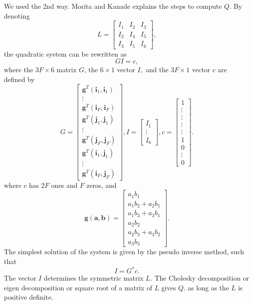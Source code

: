 We used the 2nd way. 
Morita and Kanade\cite{Morita} explains the steps to compute $ Q $. 
By denoting 
$$ L = \left[ \begin{array}{ccc}
I_1 & I_2 & I_3 \\
I_2 & I_4 & I_5 \\ 
I_3 & I_5 & I_6 \end{array} \right], $$
the quadratic system can be rewritten as
$$ GI = c, $$
where the $ 3F \times 6 $ matrix $ G $, the $ 6 \times 1 $ vector $ I, $ and the $ 3F \times 1 $ vector $ c $ are defined by
\begin{equation}
G = \left[  \begin{array}{c}
\mathbf{g}^T(\mathbf{i}_1, \mathbf{i}_1) \\
\vdots \\
\mathbf{g}^T(\mathbf{i}_F, \mathbf{i}_F) \\
\mathbf{g}^T(\mathbf{j}_1, \mathbf{j}_1) \\
\vdots \\
\mathbf{g}^T(\mathbf{j}_F, \mathbf{j}_F) \\
\mathbf{g}^T(\mathbf{i}_1, \mathbf{j}_1) \\
\vdots \\
\mathbf{g}^T(\mathbf{i}_F, \mathbf{j}_F) \end{array} \right], 
I = \left[ \begin{array}{c}
I_1    \\
\vdots \\
I_6 \end{array} \right], 
c = \left[ \begin{array}{c}
1 \\
\vdots \\
\vdots \\
\vdots \\
\vdots \\
1 \\
0 \\
\vdots \\
0 \end{array} \right]. 
\end{equation}
where $ c $ has $ 2F $ ones and $ F $ zeros, and 
\begin{equation}
\mathbf{g}(\mathbf{a}, \mathbf{b}) = \left[ \begin{array}{c}
a_1 b_1 \\
a_1 b_2 + a_2 b_1 \\
a_1 b_3 + a_3 b_1 \\
a_2 b_2 \\
a_2 b_3 + a_3 b_2 \\
a_3 b_3 \end{array} \right]. 
\end{equation}
The simplest solution of the system is given by the pseudo inverse method, such that 
$$ I = G^* c. $$
The vector $ I $ determines the symmetric matrix $ L. $
The Cholesky decomposition or eigen decomposition or square root of a matrix of $ L $ gives $ Q. $ as long as the $ L $ is positive definite. 

